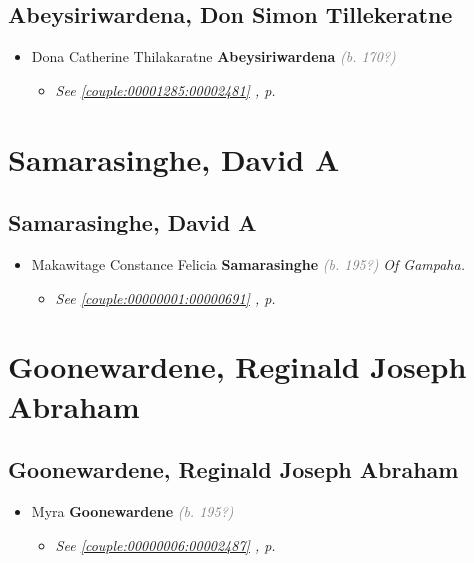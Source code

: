 \documentclass[10pt, openany]{book}
\begin{document}
\chapter{Abeysiriwardena, Don Simon Tillekeratne}
\label{00002482}
\textcolor{slmaroon}{\textit{}}
\begin{itemize}
\item{Dona Catherine Thilakaratne \textbf{Abeysiriwardena} \textcolor{gray}{\textit{(b. 170?)}}
\begin{itemize}
\item{\textcolor{slteal}{\textit{See  \autoref{couple:00001285:00002481} \textit{, p. \pageref{couple:00001285:00002481} }}}}
\end{itemize}
   }
\end{itemize}
   
\part{Samarasinghe, David A}
\chapter{Samarasinghe, David A}
\label{00002485}
\textcolor{slmaroon}{\textit{}}
\begin{itemize}
\item{Makawitage Constance Felicia \textbf{Samarasinghe} \textcolor{gray}{\textit{(b. 195?)}} \textcolor{slmaroon}{\textit{Of Gampaha.}}
\begin{itemize}
\item{\textcolor{slteal}{\textit{See  \autoref{couple:00000001:00000691} \textit{, p. \pageref{couple:00000001:00000691} }}}}
\end{itemize}
   }
\end{itemize}
  
\part{Goonewardene, Reginald Joseph Abraham}
\chapter{Goonewardene, Reginald Joseph Abraham}
\label{00002488}
\textcolor{slmaroon}{\textit{}}
\begin{itemize}
\item{Myra \textbf{Goonewardene} \textcolor{gray}{\textit{(b. 195?)}}
\begin{itemize}
\item{\textcolor{slteal}{\textit{See  \autoref{couple:00000006:00002487} \textit{, p. \pageref{couple:00000006:00002487} }}}}
\end{itemize}
 }
\end{itemize}
   
\end{document}
